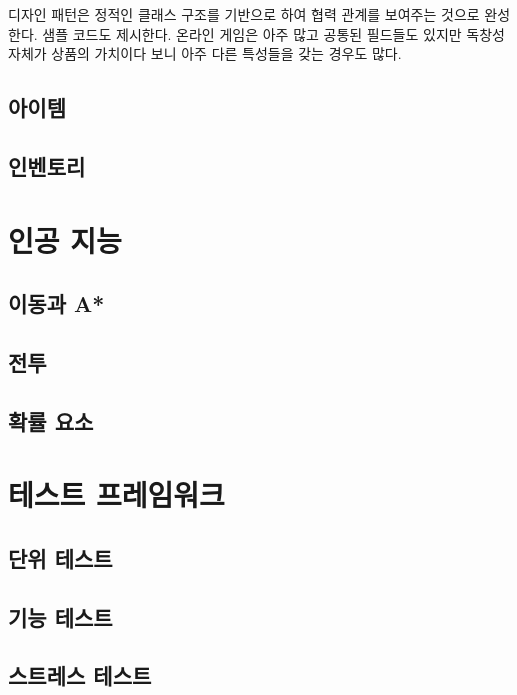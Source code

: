 \documentclass[chapter,kosection, 10.5pt, romanfixed, a4paper]{oblivoir}
\begin{document}
디자인 패턴은 정적인 클래스 구조를 기반으로 하여 협력 관계를 보여주는 것으로 완성한다. 샘플 코드도 
제시한다. 온라인 게임은 아주 많고 공통된 필드들도 있지만 독창성 자체가 상품의 가치이다 보니 아주 
다른 특성들을 갖는 경우도 많다. 



\subsection{아이템}



\subsection{인벤토리}





\section{인공 지능}

\subsection{이동과 A*}

\subsection{전투}

\subsection{확률 요소}



\section{테스트 프레임워크}

\subsection{단위 테스트}

\subsection{기능 테스트}

\subsection{스트레스 테스트}
\end{document}
